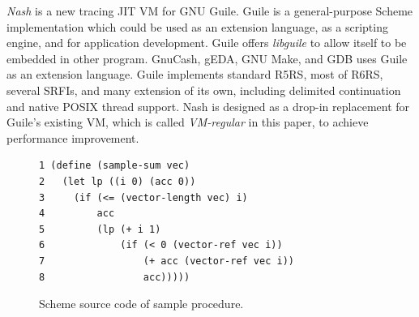 \documentclass[preprint, numbers]{sigplanconf}
\begin{document}
\textit{Nash} is a new tracing JIT VM for GNU Guile\cite{gnuguile}. Guile is a
general-purpose Scheme implementation which could be used as an extension
language, as a scripting engine, and for application development. Guile offers
\textit{libguile} to allow itself to be embedded in other program. GnuCash,
gEDA, GNU Make, and GDB uses Guile as an extension
language\cite{gnuguile}. Guile implements standard
R5RS\cite{abelson1998revised5}, most of R6RS\cite{sperber2010revised}, several
SRFIs, and many extension of its own, including delimited continuation and
native POSIX thread support\cite{guileref}. Nash is designed as a drop-in
replacement for Guile's existing VM, which is called \textit{VM-regular} in
this paper, to achieve performance improvement.

\begin{figure}
  \centering
\begin{verbatim}
1 (define (sample-sum vec)
2   (let lp ((i 0) (acc 0))
3     (if (<= (vector-length vec) i)
4         acc
5         (lp (+ i 1)
6             (if (< 0 (vector-ref vec i))
7                 (+ acc (vector-ref vec i))
8                 acc)))))
\end{verbatim}
\caption{Scheme source code of sample procedure.}
\label{fig:scmloop}
\end{figure}
\end{document}
